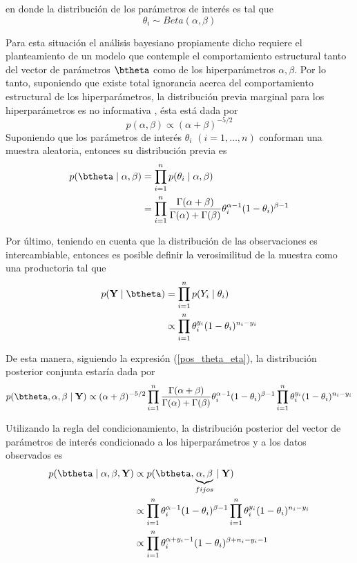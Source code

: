 \documentclass[10pt,openright]{book}\usepackage[]{graphicx}\usepackage[]{color}
\begin{document}
en donde la distribuci\'on de los par\'ametros de inter\'es es tal que
\begin{equation*}
\theta_i \sim Beta(\alpha, \beta)
\end{equation*}

Para esta situaci\'on el an\'alisis bayesiano propiamente dicho requiere el planteamiento de un modelo que contemple el comportamiento estructural tanto del vector de par\'ametros $\btheta$ como de los hiperpar\'ametros $\alpha, \beta$. Por lo tanto, suponiendo que existe total ignorancia acerca del comportamiento estructural de los hiperpar\'ametros, la distribuci\'on previa marginal para los hiperpar\'ametros es no informativa \cite{Gelman03}, \'esta est\'a dada por
\begin{equation*}
p(\alpha,\beta)\propto(\alpha+\beta)^{-5/2}
\end{equation*}
Suponiendo que los par\'ametros de inter\'es $\theta_i$ $(i=1,\ldots,n)$ conforman una muestra aleatoria, entonces su distribuci\'on previa es
\begin{align*}
p(\btheta \mid \alpha, \beta)&=\prod_{i=1}^n p(\theta_i \mid \alpha, \beta)\\
&=\prod_{i=1}^n \frac{\Gamma(\alpha+\beta)}{\Gamma(\alpha)+\Gamma(\beta)}
\theta_i^{\alpha-1}(1-\theta_i)^{\beta-1}
\end{align*}

Por \'ultimo, teniendo en cuenta que la distribuci\'on de las observaciones es intercambiable, entonces es posible definir la verosimilitud de la muestra como una productoria tal que
\begin{align*}
p(\mathbf{Y} \mid \btheta)&=\prod_{i=1}^n p(Y_i \mid \theta_i)\\
&\propto \prod_{i=1}^n \theta_i^{y_i}(1-\theta_i)^{n_i-y_i}
\end{align*}

De esta manera, siguiendo la expresi\'on (\ref{pos_theta_eta}), la distribuci\'on posterior conjunta estar\'ia dada por
\begin{equation*}
p(\btheta,\alpha,\beta \mid \mathbf{Y})\propto
(\alpha+\beta)^{-5/2}\prod_{i=1}^n \frac{\Gamma(\alpha+\beta)}{\Gamma(\alpha)+\Gamma(\beta)}
\theta_i^{\alpha-1}(1-\theta_i)^{\beta-1}\prod_{i=1}^n \theta_i^{y_i}(1-\theta_i)^{n_i-y_i}
\end{equation*}

Utilizando la regla del condicionamiento, la distribuci\'on posterior del vector de par\'ametros de inter\'es condicionado a los hiperpar\'ametros y a los datos observados es
\begin{align*}
p(\btheta \mid \alpha,\beta,\mathbf{Y})
&\propto p(\btheta,\underbrace{\alpha,\beta}_{fijos} \mid \mathbf{Y})\\
&\propto \prod_{i=1}^n \theta_i^{\alpha-1}(1-\theta_i)^{\beta-1}\prod_{i=1}^n \theta_i^{y_i}(1-\theta_i)^{n_i-y_i}\\
&\propto \prod_{i=1}^n \theta_i^{\alpha+y_i-1}(1-\theta_i)^{\beta+n_i-y_i-1}
\end{align*}
\end{document}
